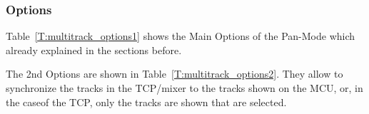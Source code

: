 \subsubsection{Options}\label{panOptions}
Table~\ref{T:multitrack_options1} shows the Main Options of the Pan-Mode which
already explained in the sections before.


The 2nd Options are shown in Table~\ref{T:multitrack_options2}. They allow to
synchronize the tracks in the TCP/mixer to the tracks shown on the MCU, or, in
the caseof the TCP, only the tracks are shown that are selected.


